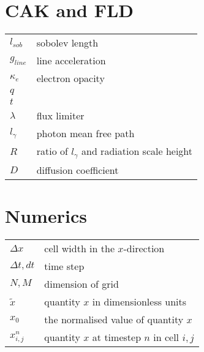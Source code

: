 \begin{multicols}{2}
\section*{CAK and FLD}
\begin{tabular}{ll}
$l_{sob}$          & sobolev length \\
$g_{line}$         & line acceleration\\
$\kappa_e$         & electron opacity \\
$q$                &   \\
$t$                &   \\
$\lambda$          & flux limiter \\
$l_\gamma$		   & photon mean free path \\
$R$                & ratio of $l_\gamma$ and radiation scale height\\
$D$                & diffusion coefficient\\
\end{tabular}

\section*{Numerics}
\begin{tabular}{ll}
$\Delta x$       & cell width in the $x$-direction\\
$\Delta t, dt$	 & time step \\
$N,M$            & dimension of grid \\
$\tilde{x}$      & quantity $x$ in dimensionless units \\
$x_0$		     & the normalised value of quantity $x$ \\
$x_{i,j}^n$	     & quantity $x$ at timestep $n$ in cell $i,j$ \\
\end{tabular}


\end{multicols}
